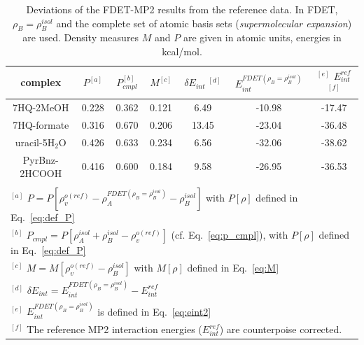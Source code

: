 \documentclass[amsmath,amssymb,preprint,aip,jcp]{revtex4-1}
\begin{document}
\begin{table}
{
\begin{center}
\begin{tabular}{|c|c|c|c|c|c|c|}
\hline
 complex & $P^{[a]}$ & $P_{cmpl}^{[b]}$ & $M^{[c]}$ & $\delta E_{int}\;^{[d]}$ & $E^{FDET(\rho_B=\rho_B^{isol})}_{int}$ & $^{[e]}$ $E_{int}^{ref}$ $^{[f]}$ \\ \hline
7HQ-2MeOH & 0.228 & 0.362 & 0.121 & 6.49 & -10.98 & -17.47 \\ \hline
7HQ-formate & 0.316 & 0.670 & 0.206 & 13.45 & -23.04 & -36.48 \\ \hline
uracil-5H$_2$O & 0.426 & 0.633 & 0.234 & 6.56 & -32.06 & -38.62 \\ \hline
PyrBnz-2HCOOH & 0.416 & 0.600 & 0.184 & 9.58 & -26.95 & -36.53 \\ \hline
\multicolumn{7}{c}{ } \\
\multicolumn{7}{l}{$^{[a]}$ $P=P[\rho_v^{o(ref)} - \rho_{A}^{FDET(\rho_B=\rho_B^{isol})}-\rho_B^{isol}]$  with $P[\rho]$ defined in Eq.~\ref{eq:def_P}}\\
\multicolumn{7}{l}{$^{[b]}$ $P_{cmpl}=P[\rho_A^{isol}+\rho_B^{isol} - \rho_v^{o(ref)}]$ (cf. Eq.~\ref{eq:p_cmpl}), with $P[\rho]$ defined in Eq.~\ref{eq:def_P}}\\
\multicolumn{7}{l}{$^{[c]}$ $M=M[\rho_v^{o(ref)} - \rho^{isol}_{B}]$ with $M[\rho]$ defined in Eq.~\ref{eq:M}}\\
\multicolumn{7}{l}{$^{[d]}$ $\delta E_{int}=E^{FDET(\rho_B=\rho_B^{isol})}_{int}-E_{int}^{ref}$} \\
\multicolumn{7}{l}{$^{[e]}$ $E^{FDET(\rho_B=\rho_B^{isol})}_{int}$ is defined in Eq.~\ref{eq:eint2}}\\
\multicolumn{7}{l}{$^{[f]}$ The reference MP2 interaction energies ($E_{int}^{ref}$) are counterpoise corrected.}
\end{tabular}
\end{center}%
\caption{Deviations of the FDET-MP2 results from the reference data. In FDET, $\rho_B=\rho_B^{isol}$ and the complete set of atomic basis sets ({\it supermolecular expansion}) are used. 
Density measures $M$ and $P$ are given in atomic units, energies in kcal/mol.
}
\label{table:SE_isol}
}
\end{table}
\end{document}
